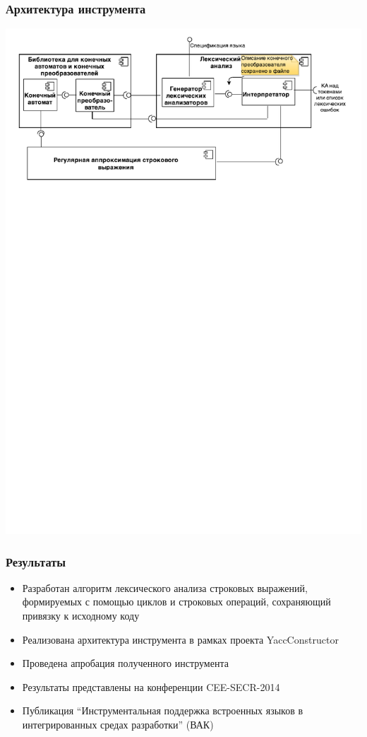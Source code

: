 \documentclass{beamer}
\begin{document}
\begin{frame}
\transwipe[direction=90]
\frametitle{Архитектура инструмента}
\begin{center}
   {\includegraphics[width=1.0\linewidth]{ComponentDiagram_rus}}
\end{center}
\end{frame}


\begin{frame}%
\transwipe[direction=90]
\frametitle{Результаты}

\begin{itemize}
\item Разработан алгоритм лексического анализа строковых выражений, формируемых с помощью циклов и строковых операций, сохраняющий привязку к исходному коду 
\item Реализована архитектура инструмента в рамках проекта YaccConstructor
\item Проведена апробация полученного инструмента
\item Результаты представлены на конференции CEE-SECR-2014
\item Публикация ``Инструментальная поддержка встроенных языков в интегрированных средах разработки'' (ВАК)
\end{itemize}
\end{frame}
\end{document}
